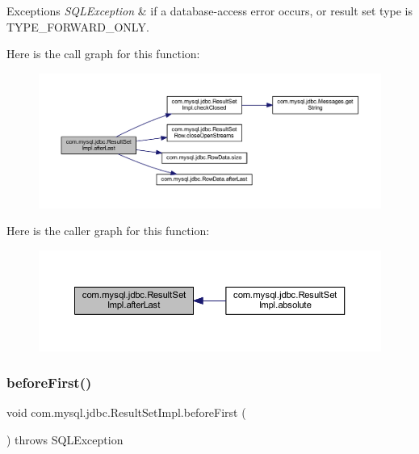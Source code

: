 \begin{DoxyExceptions}{Exceptions}
{\em S\+Q\+L\+Exception} & if a database-\/access error occurs, or result set type is T\+Y\+P\+E\+\_\+\+F\+O\+R\+W\+A\+R\+D\+\_\+\+O\+N\+LY. \\
\hline
\end{DoxyExceptions}
Here is the call graph for this function\+:
\nopagebreak
\begin{figure}[H]
\begin{center}
\leavevmode
\includegraphics[width=350pt]{classcom_1_1mysql_1_1jdbc_1_1_result_set_impl_aee4b698ed324d8836812bd80994aeb5e_cgraph}
\end{center}
\end{figure}
Here is the caller graph for this function\+:
\nopagebreak
\begin{figure}[H]
\begin{center}
\leavevmode
\includegraphics[width=350pt]{classcom_1_1mysql_1_1jdbc_1_1_result_set_impl_aee4b698ed324d8836812bd80994aeb5e_icgraph}
\end{center}
\end{figure}
\mbox{\label{classcom_1_1mysql_1_1jdbc_1_1_result_set_impl_af1a54bdb7af316f706caf50a5819f1e9}} 
\subsubsection{\texorpdfstring{before\+First()}{beforeFirst()}}
{\footnotesize\ttfamily void com.\+mysql.\+jdbc.\+Result\+Set\+Impl.\+before\+First (\begin{DoxyParamCaption}{ }\end{DoxyParamCaption}) throws S\+Q\+L\+Exception}

